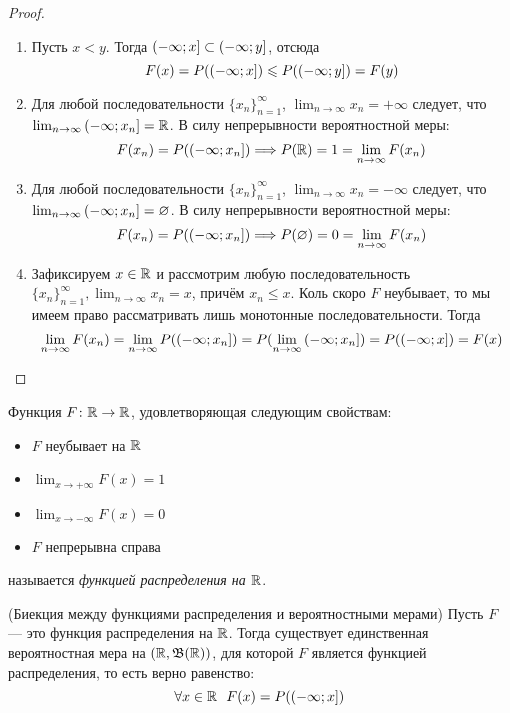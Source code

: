 \begin{proof}~
	\begin{enumerate}
		\item Пусть $x < y$. Тогда $\left(-\infty; x\right] \subset \left(-\infty; y\right]$, отсюда
		\[
			F(x) = P(\left(-\infty; x\right]) \leqslant P(\left(-\infty; y\right]) = F(y)
		\]
		
		\item Для любой последовательности $\{x_n\}_{n = 1}^\infty$, $\lim_{n \to \infty} x_n = +\infty$ следует, что $\lim_{n \to \infty} \left(-\infty; x_n\right] = \mathbb{R}$. В силу непрерывности вероятностной меры:
		\[
			F(x_n) = P(\left(-\infty; x_n\right]) \Longrightarrow P(\mathbb{R}) = 1 = \lim_{n \to \infty} F(x_n)
		\]
		
		\item Для любой последовательности $\{x_n\}_{n = 1}^\infty$, $\lim_{n \to \infty} x_n = -\infty$ следует, что $\lim_{n \to \infty} \left(-\infty; x_n\right] = \varnothing$. В силу непрерывности вероятностной меры:
		\[
			F(x_n) = P(\left(-\infty; x_n\right]) \Longrightarrow P(\varnothing) = 0 = \lim_{n \to \infty} F(x_n)
		\]
		
		\item Зафиксируем $x \in \mathbb{R}$ и рассмотрим любую последовательность $\{x_n\}_{n = 1}^\infty, \lim_{n \to \infty} x_n = x$, причём $x_n \le x$. Коль скоро $F$ неубывает, то мы имеем право рассматривать лишь монотонные последовательности. Тогда
		\[
			\lim_{n \to \infty} F(x_n) = \lim_{n \to \infty} P(\left(-\infty; x_n\right]) = P(\lim_{n \to \infty} \left(-\infty; x_n\right]) = P(\left(-\infty; x\right]) = F(x)
		\]
	\end{enumerate}
\end{proof}

\begin{definition}
	Функция $F \colon \mathbb{R} \to \mathbb{R}$, удовлетворяющая следующим свойствам:
	\begin{itemize}
		\item $F$ неубывает на $\mathbb{R}$
		
		\item $\lim_{x \to +\infty} F(x) = 1$
		
		\item $\lim_{x \to -\infty} F(x) = 0$
		
		\item $F$ непрерывна справа
	\end{itemize}
	называется \textit{функцией распределения на $\mathbb{R}$}.
\end{definition}

\begin{theorem} (Биекция между функциями распределения и вероятностными мерами)
	Пусть $F$ --- это функция распределения на $\mathbb{R}$. Тогда существует единственная вероятностная мера на $(\mathbb{R}, \mathfrak{B}(\mathbb{R}))$, для которой $F$ является функцией распределения, то есть верно равенство:
	\[
		\forall x \in \mathbb{R}\ \ F(x) = P(\left(-\infty; x\right])
	\]
\end{theorem}

